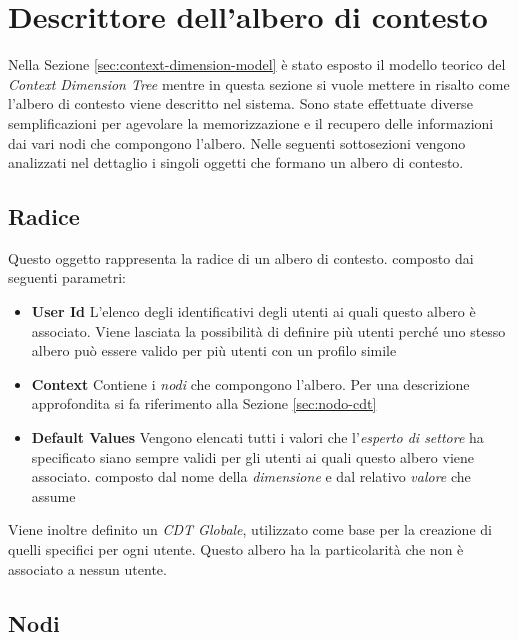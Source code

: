 \section{Descrittore dell'albero di contesto\label{sec:descrittore-albero-contesto}}

Nella Sezione \ref{sec:context-dimension-model} è stato esposto il modello teorico del \emph{Context Dimension Tree} mentre in questa sezione si vuole mettere in risalto come l'albero di contesto viene descritto nel sistema. Sono state effettuate diverse semplificazioni per agevolare la memorizzazione e il recupero delle informazioni dai vari nodi che compongono l'albero. Nelle seguenti sottosezioni vengono analizzati nel dettaglio i singoli oggetti che formano un albero di contesto.

\subsection{Radice\label{sec:radice-cdt}}

Questo oggetto rappresenta la radice di un albero di contesto. \upe composto dai seguenti parametri:

\begin{itemize}
	\item \textbf{User Id}
	L'elenco degli identificativi degli utenti ai quali questo albero è associato. Viene lasciata la possibilità di definire più utenti perché uno stesso albero può essere valido per più utenti con un profilo simile
	\item \textbf{Context}
	Contiene i \emph{nodi} che compongono l'albero. Per una descrizione approfondita si fa riferimento alla Sezione \ref{sec:nodo-cdt}
	\item \textbf{Default Values}
	Vengono elencati tutti i valori che l'\emph{esperto di settore} ha specificato siano sempre validi per gli utenti ai quali questo albero viene associato. \upe composto dal nome della \emph{dimensione} e dal relativo \emph{valore} che assume
\end{itemize}

Viene inoltre definito un \emph{CDT Globale}, utilizzato come base per la creazione di quelli specifici per ogni utente. Questo albero ha la particolarità che non è associato a nessun utente.

\subsection{Nodi\label{sec:nodo-cdt}}

